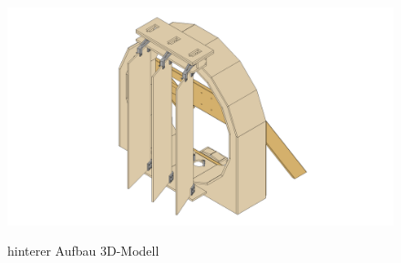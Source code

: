 \begin{figure}[H]
    \centering
    \includegraphics[width=1.1\textwidth]{../Inventor/hintererAufbau/png/hintererAufbau_hauptansicht.png}
    \label{fig:aufbau:haupt}
    \caption{hinterer Aufbau 3D-Modell}
\end{figure}

